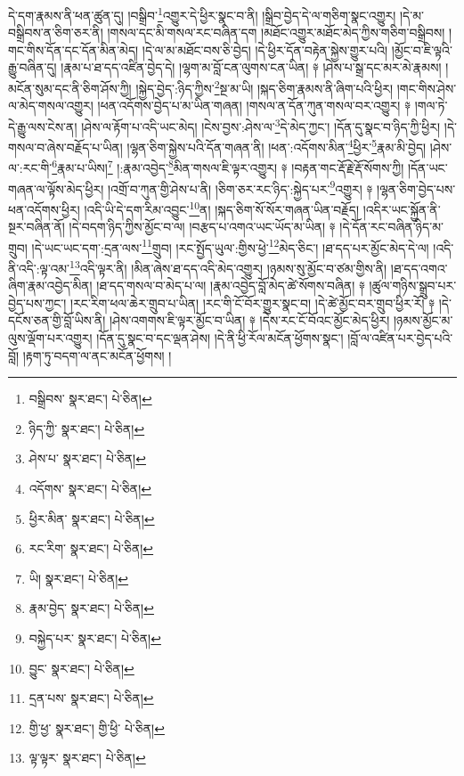དེ་དག་རྣམས་ནི་ཕན་ཚུན་དུ། །བསྒྲིབ་\footnote{བསྒྲིབས་  སྣར་ཐང་།  པེ་ཅིན། }འགྱུར་དེ་ཕྱིར་སྣང་བ་ནི། །སྒྲིབ་བྱེད་དེ་ལ་གཅིག་སྣང་འགྱུར། །དེ་མ་བསྒྲིབས་ན་ཅིག་ཅར་ནི། །གསལ་དང་མི་གསལ་རང་བཞིན་དག །མཐོང་འགྱུར་མཐོང་མེད་ཀྱིས་གཅིག་བསྒྲིབས། །གང་གིས་དོན་དང་དོན་མིན་མེད། །དེ་ལ་མ་མཐོང་བས་ཅི་བྱེད། །དེ་ཕྱིར་དོན་བརྟེན་སྐྱེས་གྱུར་པའི། །མྱོང་བ་ཇི་ལྟའི་རྒྱུ་བཞིན་དུ། །རྣམ་པ་ཐ་དད་འཛིན་བྱེད་དེ། །ལྷག་མ་བློ་ངན་ལུགས་ངན་ཡིན། ༈ །ཤེས་པ་སྒྲ་དང་མར་མེ་རྣམས། །མངོན་སུམ་དང་ནི་ཅིག་ཤོས་ཀྱི། །སྐྱེད་བྱེད་:ཉིད་ཀྱིས་\footnote{ཉིད་ཀྱི་  སྣར་ཐང་།  པེ་ཅིན། }སྔ་མ་ཡི། །སྐད་ཅིག་རྣམས་ནི་ཞིག་པའི་ཕྱིར། །གང་གིས་ཤེས་ལ་མེད་གསལ་འགྱུར། །ཕན་འདོགས་བྱེད་པ་མ་ཡིན་གཞན། །གསལ་ན་དོན་ཀུན་གསལ་བར་འགྱུར། ༈ །གལ་ཏེ་དེ་རྒྱུ་ལས་ངེས་ན། །ཤེས་ལ་རྟོག་པ་འདི་ཡང་མེད། །ངེས་བྱས་:ཤེས་ལ་\footnote{ཤེས་པ་  སྣར་ཐང་།  པེ་ཅིན། }དེ་མེད་ཀྱང་། །དོན་དུ་སྣང་བ་ཉིད་ཀྱི་ཕྱིར། །དེ་གསལ་བ་ཞེས་བརྗོད་པ་ཡིན། །ལྷན་ཅིག་སྐྱེས་པའི་དོན་གཞན་ནི། །ཕན་:འདོགས་མིན་\footnote{འདོགས་  སྣར་ཐང་།  པེ་ཅིན། }ཕྱིར་\footnote{ཕྱིར་མིན་  སྣར་ཐང་།  པེ་ཅིན། }རྣམ་མི་བྱེད། །ཤེས་ལ་:རང་གི་\footnote{རང་རིག་  སྣར་ཐང་།  པེ་ཅིན། }རྣམ་པ་ཡིས།\footnote{ཡི།  སྣར་ཐང་།  པེ་ཅིན། } །:རྣམ་འབྱེད་\footnote{རྣམ་བྱེད་  སྣར་ཐང་།  པེ་ཅིན། }མིན་གསལ་ཇི་ལྟར་འགྱུར། ༈ །བརྟན་གང་རྡོ་རྗེ་རྡོ་སོགས་ཀྱི། །དོན་ཡང་གཞན་ལ་ལྟོས་མེད་ཕྱིར། །འགྲོ་བ་ཀུན་གྱི་ཤེས་པ་ནི། །ཅིག་ཅར་རང་ཉིད་:སྐྱེད་པར་\footnote{བསྐྱེད་པར་  སྣར་ཐང་།  པེ་ཅིན། }འགྱུར། ༈ །ལྷན་ཅིག་བྱེད་པས་ཕན་འདོགས་ཕྱིར། །འདི་ཡི་དེ་དག་རིམ་འབྱུང་\footnote{བྱུང་  སྣར་ཐང་།  པེ་ཅིན། }ན། །སྐད་ཅིག་སོ་སོར་གཞན་ཡིན་བརྗོད། །འདིར་ཡང་སྐྱོན་ནི་སྔར་བཞིན་ནོ། །དེ་བདག་ཉིད་ཀྱིས་མྱོང་བ་ལ། །བརྩད་པ་འགའ་ཡང་ཡོད་མ་ཡིན། ༈ །དེ་དོན་རང་བཞིན་ཉིད་མ་གྲུབ། །དེ་ཡང་ཡང་དག་:དྲན་ལས་\footnote{དྲན་པས་  སྣར་ཐང་།  པེ་ཅིན། }གྲུབ། །རང་སྤྱོད་ཡུལ་:གྱིས་ཕྱེ་\footnote{གྱི་ཕྱ་  སྣར་ཐང་། གྱི་ཕྱི་  པེ་ཅིན། }མེད་ཅིང་། །ཐ་དད་པར་མྱོང་མེད་དེ་ལ། །འདི་ནི་འདི་:ལྟ་འམ་\footnote{ལྟ་ལྟར་  སྣར་ཐང་།  པེ་ཅིན། }འདི་ལྟར་ནི། །མིན་ཞེས་ཐ་དད་འདི་མེད་འགྱུར། །ཉམས་སུ་མྱོང་བ་ཙམ་གྱིས་ནི། །ཐ་དད་འགའ་ཞིག་རྣམ་འབྱེད་མིན། །ཐ་དད་གསལ་བ་མེད་པ་ལ། །རྣམ་འབྱེད་བློ་མེད་ཚེ་སོགས་བཞིན། ༈ །ཚུལ་གཉིས་སྒྲུབ་པར་བྱེད་པས་ཀྱང་། །རང་རིག་ཕལ་ཆེར་གྲུབ་པ་ཡིན། །རང་གི་ངོ་བོར་གྱུར་སྣང་བ། །དེ་ཚེ་མྱོང་བར་གྲུབ་ཕྱིར་རོ། ༈ །དེ་དངོས་ཅན་གྱི་བློ་ཡིས་ནི། །ཤེས་འགགས་ཇི་ལྟར་མྱོང་བ་ཡིན། ༈ །དེས་རང་ངོ་བོའང་མྱོང་མེད་ཕྱིར། །ཉམས་མྱོང་མ་ལུས་ལྡོག་པར་འགྱུར། །དོན་དུ་སྣང་བ་དང་ལྡན་ཤེས། །དེ་ནི་ཕྱི་རོལ་མངོན་ཕྱོགས་སྣང་། །བློ་ལ་འཛིན་པར་བྱེད་པའི་བློ། །རྟག་ཏུ་བདག་ལ་ནང་མངོན་ཕྱོགས། །
